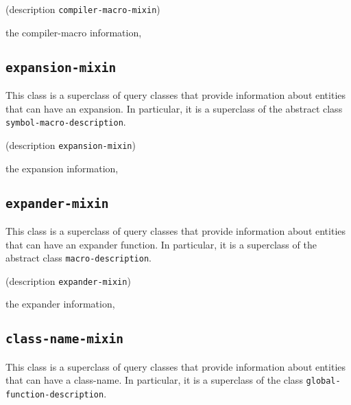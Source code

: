{\footnotesize
{}
}

{\footnotesize
{} {(description {\tt compiler-macro-mixin})}
}

 the compiler-macro information, 

\subsection{\texttt{expansion-mixin}}
\label{sec-expansion-mixin}

{\footnotesize
{}
}

This class is a superclass of query classes that provide information
about entities that can have an expansion.  In particular, it is a
superclass of the abstract class \texttt{symbol-macro-description}.

{\footnotesize
{}
}

{\footnotesize
{} {(description {\tt expansion-mixin})}
}

 the expansion information, 

\subsection{\texttt{expander-mixin}}
\label{sec-expander-mixin}

{\footnotesize
{}
}

This class is a superclass of query classes that provide information
about entities that can have an expander function.  In particular, it is
a superclass of the abstract class \texttt{macro-description}.

{\footnotesize
{}
}

{\footnotesize
{} {(description {\tt expander-mixin})}
}

 the expander information, 

\subsection{\texttt{class-name-mixin}}
\label{sec-class-name-mixin}

{\footnotesize
{}
}

This class is a superclass of query classes that provide information
about entities that can have a class-name.  In particular, it is a
superclass of the class \texttt{global-function-description}.

